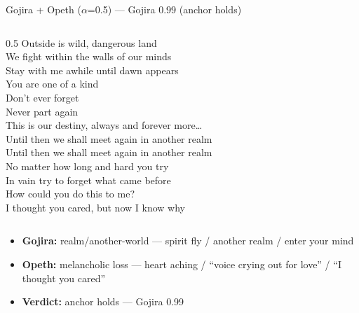 \documentclass[aspectratio=169]{beamer}
\begin{document}
\begin{frame}{Gojira + Opeth ($\alpha$=0.5) --- \textcolor{accent}{Gojira 0.99 (anchor holds)}}
\begin{columns}[T]
\begin{column}{0.5\textwidth}
      Outside is wild, dangerous land\\
      We fight within the walls of our minds\\
      Stay with me awhile until dawn appears\\
      You are one of a kind\\
      Don't ever forget\\
      Never part again\\
      This is our destiny, always and forever more\ldots\\
      Until then we shall meet again in another realm\\
      Until then we shall meet again in another realm\\[4pt]
      No matter how long and hard you try\\
      In vain try to forget what came before\\
      How could you do this to me?\\
      I thought you cared, but now I know why
    \end{column}
  \end{columns}
  \upshape\vskip3pt\footnotesize
  \begin{itemize}\setlength{\itemsep}{1pt}
    \item \textbf{Gojira:} realm/another-world --- spirit fly / another realm / enter your mind
    \item \textbf{Opeth:} melancholic loss --- heart aching / ``voice crying out for love'' / ``I thought you cared''
    \item \textcolor{accent}{\textbf{Verdict:} anchor holds --- Gojira 0.99}
  \end{itemize}
\end{frame}
\end{document}
